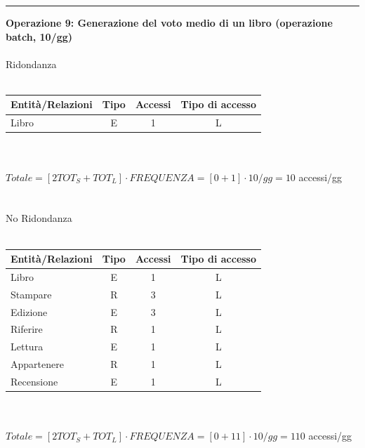 \documentclass{article}
\begin{document}
\vspace{0.5cm} %
\hrule
\vspace{0.5cm} %

\noindent
\textbf{Operazione 9: Generazione del voto medio di un libro (operazione batch, 10/gg) }
\\\\
Ridondanza
\\\\
\begin{tabular}{|l|c|c|c|}
	\hline
	\textbf{Entità/Relazioni} & \textbf{Tipo} & \textbf{Accessi} & \textbf{Tipo di accesso} \\
	\hline
	Libro                     & E             & 1                & L                        \\
	\hline
\end{tabular}
\\\\
$Totale = [2TOT_S + TOT_L] \cdot FREQUENZA =  [0 + 1] \cdot 10/gg = 10$ accessi/gg
\\\\\\No Ridondanza
\\\\\begin{tabular}{|l|c|c|c|}
	\hline
	\textbf{Entità/Relazioni} & \textbf{Tipo} & \textbf{Accessi} & \textbf{Tipo di accesso} \\
	\hline
	Libro                     & E             & 1                & L                        \\
	Stampare                  & R             & 3                & L                        \\
	Edizione                  & E             & 3                & L                        \\
	Riferire                  & R             & 1                & L                        \\
	Lettura                   & E             & 1                & L                        \\
	Appartenere               & R             & 1                & L                        \\
	Recensione                & E             & 1                & L                        \\
	\hline
\end{tabular}
\\\\
$Totale = [2TOT_S + TOT_L] \cdot FREQUENZA =  [0 + 11] \cdot 10/gg = 110$ accessi/gg
\end{document}
